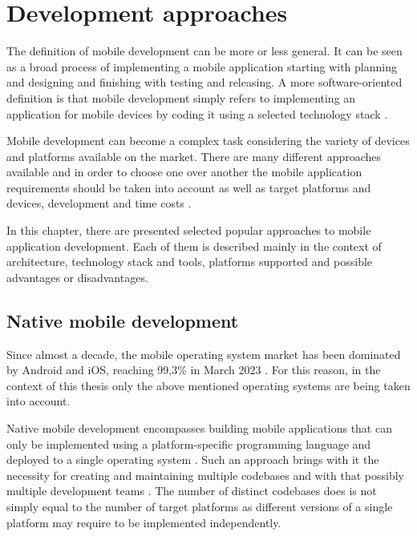 
\section{Development approaches}

The definition of mobile development can be more or less general. It can be seen as a broad process of implementing a mobile application starting with planning and designing and finishing with testing and releasing. A more software-oriented definition is that mobile development simply refers to implementing an application for mobile devices by coding it using a selected technology stack \cite{microsoft_mobile_development}.

Mobile development can become a complex task considering the variety of devices and platforms available on the market. There are many different approaches available and in order to choose one over another the mobile application requirements should be taken into account as well as target platforms and devices, development and time costs \cite{velvetech_mobile_dev_approaches}.

In this chapter, there are presented selected popular approaches to mobile application development. Each of them is described mainly in the context of architecture, technology stack and tools, platforms supported and possible advantages or disadvantages.

\subsection{Native mobile development}

Since almost a decade, the mobile operating system market has been dominated by Android and iOS, reaching 99,3\% in March 2023 \cite{statcounter_mobile_os_market}. For this reason, in the context of this thesis only the above mentioned operating systems are being taken into account.

Native mobile development encompasses building mobile applications that can only be implemented using a platform-specific programming language and deployed to a single operating system \cite{comparative_analysis_native_hybrid}. Such an approach brings with it the necessity for creating and maintaining multiple codebases and with that possibly multiple development teams \cite{approach_to_assess_performance_case_study}. The number of distinct codebases does is not simply equal to the number of target platforms as different versions of a single platform may require to be implemented independently. 

